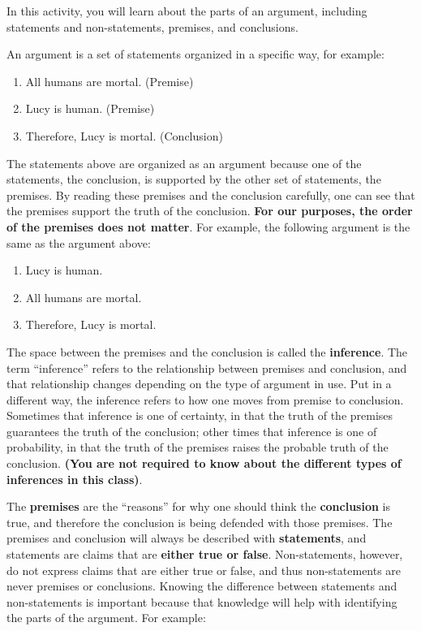 \documentclass[
]{book}
\providecommand{\tightlist}{%
  \setlength{\itemsep}{0pt}\setlength{\parskip}{0pt}}
\begin{document}
\begin{reflect}
In this activity, you will learn about the parts of an argument, including statements and non-statements, premises, and conclusions.

An argument is a set of statements organized in a specific way, for example:

\begin{enumerate}
\def\labelenumi{\arabic{enumi}.}
\tightlist
\item
  All humans are mortal. (Premise)
\item
  Lucy is human. (Premise)
\item
  Therefore, Lucy is mortal. (Conclusion)
\end{enumerate}

The statements above are organized as an argument because one of the statements, the conclusion, is supported by the other set of statements, the premises. By reading these premises and the conclusion carefully, one can see that the premises support the truth of the conclusion. \textbf{For our purposes, the order of the premises does not matter}. For example, the following argument is the same as the argument above:

\begin{enumerate}
\def\labelenumi{\arabic{enumi}.}
\tightlist
\item
  Lucy is human.
\item
  All humans are mortal.
\item
  Therefore, Lucy is mortal.
\end{enumerate}

The space between the premises and the conclusion is called the \textbf{inference}. The term ``inference'' refers to the relationship between premises and conclusion, and that relationship changes depending on the type of argument in use. Put in a different way, the inference refers to how one moves from premise to conclusion. Sometimes that inference is one of certainty, in that the truth of the premises guarantees the truth of the conclusion; other times that inference is one of probability, in that the truth of the premises raises the probable truth of the conclusion. \textbf{(You are not required to know about the different types of inferences in this class)}.

The \textbf{premises} are the ``reasons'' for why one should think the \textbf{conclusion} is true, and therefore the conclusion is being defended with those premises. The premises and conclusion will always be described with \textbf{statements}, and statements are claims that are \textbf{either true or false}. Non-statements, however, do not express claims that are either true or false, and thus non-statements are never premises or conclusions. Knowing the difference between statements and non-statements is important because that knowledge will help with identifying the parts of the argument. For example:


\end{reflect}
\end{document}

